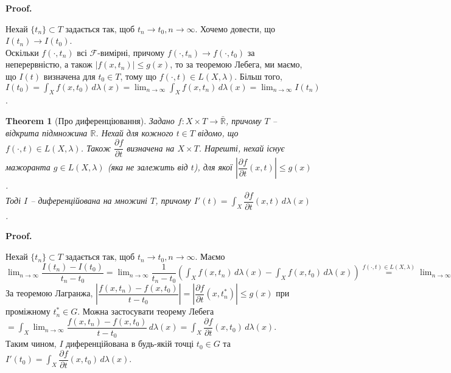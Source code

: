 \documentclass[a4paper, 10pt]{article}
\makeatletter
\theoremstyle{theoremdd}
\newtheorem{theorem}{Theorem}[subsection]
\renewenvironment{proof}[1][Proof.\\]{\par
\pushQED{\hfill \qed}%
\normalfont \topsep6\p@\@plus6\p@\relax
\trivlist
\item\relax
{\bfseries
#1\@addpunct{.}}\hspace\labelsep\ignorespaces
}{%
\popQED\endtrivlist\@endpefalse
}
\makeatother
\begin{document}
\begin{proof}
Нехай $\{t_n\} \subset T$ задається так, щоб $t_n \to t_0, n \to \infty$. Хочемо довести, що $I(t_n) \to I(t_0)$.\\
Оскільки $f(\cdot,t_n)$ всі $\mathcal{F}$-вимірні, причому $f(\cdot,t_n) \to f(\cdot,t_0)$ за неперервністю, а також $|f(x,t_n)| \leq g(x)$, то за теоремою Лебега, ми маємо, що $I(t)$ визначена для $t_0 \in T$, тому що $f(\cdot,t) \in L(X,\lambda)$. Більш того, $I(t_0) = \displaystyle\int_X f(x,t_0)\,d\lambda(x) = \lim_{n \to \infty} \int_X f(x,t_n)\,d\lambda(x) = \lim_{n \to \infty} I(t_n)$.
\end{proof}

\begin{theorem}[Про диференціювання]
Задано $f \colon X \times T \to \bar{\mathbb{R}}$, причому $T$ -- відкрита підмножина $\mathbb{R}$. Нехай для кожного $t \in T$ відомо, що $f(\cdot,t) \in L(X,\lambda)$. Також $\dfrac{\partial f}{\partial t}$ визначена на $X \times T$. Нарешті, нехай існує мажоранта $g \in L(X,\lambda)$ (яка не залежить від $t$), для якої $\left| \dfrac{\partial f}{\partial t}(x,t) \right| \leq g(x)$.\\
Тоді $I$ -- диференційована на множині $T$, причому $I'(t) = \displaystyle\int_X \dfrac{\partial f}{\partial t}(x,t)\,d\lambda(x)$.
\end{theorem}

\begin{proof}
Нехай $\{t_n\} \subset T$ задається так, щоб $t_n \to t_0, n \to \infty$. Маємо\\
$\displaystyle\lim_{n \to \infty} \dfrac{I(t_n) - I(t_0)}{t_n-t_0} = \lim_{n \to \infty} \dfrac{1}{t_n-t_0} \left( \int_X f(x,t_n)\,d\lambda(x) - \int_X f(x,t_0)\,d\lambda(x) \right) \overset{f(\cdot,t) \in L(X,\lambda)}{=} \lim_{n \to \infty} \int_X \dfrac{f(x,t_n) - f(x,t_0)}{t-t_0} \boxed{=}$\\
За теоремою Лагранжа, $\left| \dfrac{f(x,t_n)-f(x,t_0)}{t-t_0} \right| = \left| \dfrac{\partial f}{\partial t}(x,t_n^*) \right| \leq g(x)$ при проміжному $t_n^* \in G$. Можна застосувати теорему Лебега\\
$\displaystyle\boxed{=} \int_X \lim_{n \to \infty} \dfrac{f(x,t_n) - f(x,t_0)}{t-t_0}\,d\lambda(x) = \int_X \dfrac{\partial f}{\partial t}(x,t_0)\,d\lambda(x)$.\\
Таким чином, $I$ диференційована в будь-якій точці $t_0 \in G$ та $I'(t_0) = \displaystyle\int_X \dfrac{\partial f}{\partial t}(x,t_0)\,d\lambda(x)$.
\end{proof}
\end{document}
